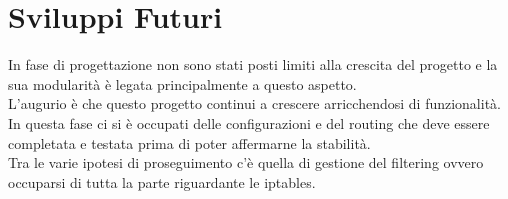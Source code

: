 \section{Sviluppi Futuri}
In fase di progettazione non sono stati posti limiti alla crescita del progetto e la sua modularit\`a \`e legata principalmente a questo aspetto.\\
L'augurio \`e che questo progetto continui a crescere arricchendosi di funzionalit\`a.\\
In questa fase ci si \`e occupati delle configurazioni e del routing che deve essere completata e testata prima di poter affermarne la stabilit\`a.\\
Tra le varie ipotesi di proseguimento c'\`e quella di gestione del filtering ovvero occuparsi di tutta la parte riguardante le iptables.
\clearpage{\pagestyle{empty}\cleardoublepage} 
